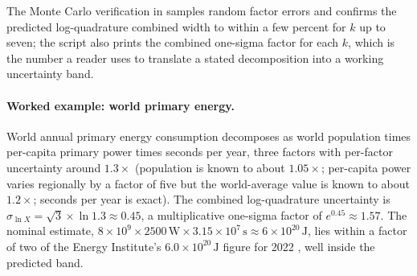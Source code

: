 

The Monte Carlo verification in
samples random factor errors and confirms the predicted log-quadrature
combined width to within a few percent for $k$ up to seven; the
script also prints the combined one-sigma factor for each $k$, which
is the number a reader uses to translate a stated decomposition into
a working uncertainty band.

\paragraph{Worked example: world primary energy.}
World annual primary energy consumption decomposes as world population
times per-capita primary power times seconds per year, three factors
with per-factor uncertainty around $1.3\times$ (population is known to
about $1.05\times$; per-capita power varies regionally by a factor of
five but the world-average value is known to about $1.2\times$;
seconds per year is exact). The combined log-quadrature uncertainty is
$\sigma_{\ln X} = \sqrt{3} \times \ln 1.3 \approx 0.45$, a
multiplicative one-sigma factor of $e^{0.45} \approx 1.57$. The
nominal estimate, $8 \times 10^{9} \times 2500 \,\si{\watt} \times
3.15 \times 10^{7} \,\si{\second} \approx 6 \times 10^{20}
\,\si{\joule}$, lies within a factor of two of the Energy Institute's
$6.0 \times 10^{20} \,\si{\joule}$ figure for 2022
\cite{data:ch09-bp-statistical-2024}, well inside the predicted band.

